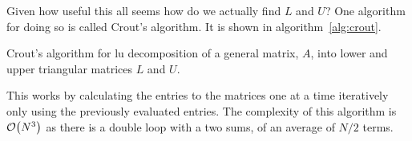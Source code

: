 \documentclass[a4paper]{article}
\begin{document}
    Given how useful this all seems how do we actually find \(L\) and \(U\)?
    One algorithm for doing so is called Crout's algorithm.
    It is shown in algorithm~\ref{alg:crout}.
    \begin{algorithm}[ht]
    \caption{Crout's algorithm for \gls{lu} decomposition of a general matrix, \(A\), into lower and upper triangular matrices \(L\) and \(U\).}
    \label{alg:crout}
    \end{algorithm}
    This works by calculating the entries to the matrices one at a time iteratively only using the previously evaluated entries.
    The complexity of this algorithm is \(\order{N^3}\) as there is a double loop with a two sums, of an average of \(N/2\) terms.
    
\end{document}
